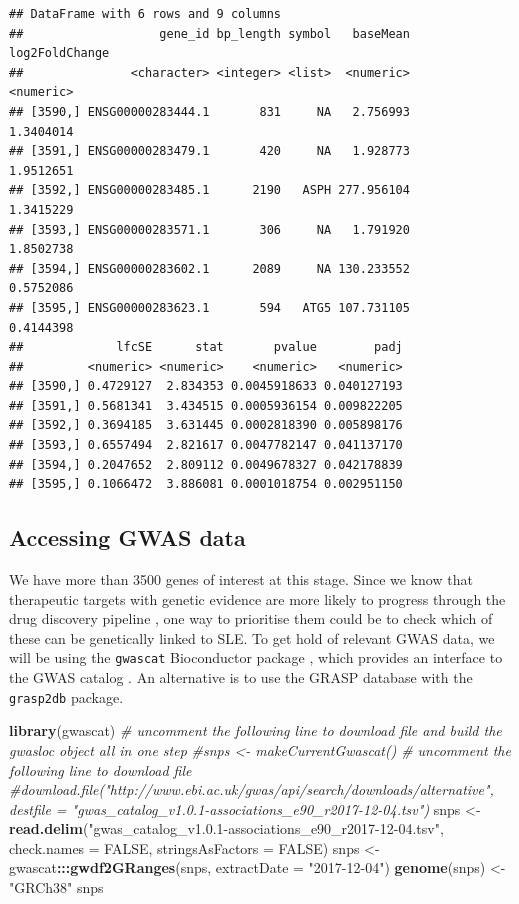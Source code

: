 \documentclass[9pt,a4paper,]{extarticle}
\newenvironment{Shaded}{\begin{snugshade}}{\end{snugshade}}
\newcommand{\KeywordTok}[1]{\textcolor[rgb]{0.13,0.29,0.53}{\textbf{#1}}}
\newcommand{\DataTypeTok}[1]{\textcolor[rgb]{0.13,0.29,0.53}{#1}}
\newcommand{\StringTok}[1]{\textcolor[rgb]{0.31,0.60,0.02}{#1}}
\newcommand{\CommentTok}[1]{\textcolor[rgb]{0.56,0.35,0.01}{\textit{#1}}}
\newcommand{\OtherTok}[1]{\textcolor[rgb]{0.56,0.35,0.01}{#1}}
\newcommand{\OperatorTok}[1]{\textcolor[rgb]{0.81,0.36,0.00}{\textbf{#1}}}
\newcommand{\NormalTok}[1]{#1}
\begin{document}
\begin{verbatim}
## DataFrame with 6 rows and 9 columns
##                   gene_id bp_length symbol   baseMean log2FoldChange
##               <character> <integer> <list>  <numeric>      <numeric>
## [3590,] ENSG00000283444.1       831     NA   2.756993      1.3404014
## [3591,] ENSG00000283479.1       420     NA   1.928773      1.9512651
## [3592,] ENSG00000283485.1      2190   ASPH 277.956104      1.3415229
## [3593,] ENSG00000283571.1       306     NA   1.791920      1.8502738
## [3594,] ENSG00000283602.1      2089     NA 130.233552      0.5752086
## [3595,] ENSG00000283623.1       594   ATG5 107.731105      0.4144398
##             lfcSE      stat       pvalue        padj
##         <numeric> <numeric>    <numeric>   <numeric>
## [3590,] 0.4729127  2.834353 0.0045918633 0.040127193
## [3591,] 0.5681341  3.434515 0.0005936154 0.009822205
## [3592,] 0.3694185  3.631445 0.0002818390 0.005898176
## [3593,] 0.6557494  2.821617 0.0047782147 0.041137170
## [3594,] 0.2047652  2.809112 0.0049678327 0.042178839
## [3595,] 0.1066472  3.886081 0.0001018754 0.002951150
\end{verbatim}

\subsection{Accessing GWAS data}\label{accessing-gwas-data}

We have more than 3500 genes of interest at this stage.
Since we know that therapeutic targets with genetic evidence are more likely to progress through the drug discovery pipeline \citep{Nelson2015}, one way to prioritise them could be to check which of these can be genetically linked to SLE.
To get hold of relevant GWAS data, we will be using the \texttt{gwascat} Bioconductor package \citep{Carey2017a}, which provides an interface to the GWAS catalog \citep{MacArthur2017}.
An alternative is to use the GRASP \citep{Eicher2015} database with the \texttt{grasp2db} \citep{Carey2017b} package.

\begin{Shaded}
\begin{Highlighting}[]
\KeywordTok{library}\NormalTok{(gwascat)}
\CommentTok{# uncomment the following line to download file and build the gwasloc object all in one step}
\CommentTok{#snps <- makeCurrentGwascat()}
\CommentTok{# uncomment the following line to download file}
\CommentTok{#download.file("http://www.ebi.ac.uk/gwas/api/search/downloads/alternative", destfile = "gwas_catalog_v1.0.1-associations_e90_r2017-12-04.tsv")}
\NormalTok{snps <-}\StringTok{ }\KeywordTok{read.delim}\NormalTok{(}\StringTok{"gwas_catalog_v1.0.1-associations_e90_r2017-12-04.tsv"}\NormalTok{, }\DataTypeTok{check.names =} \OtherTok{FALSE}\NormalTok{, }\DataTypeTok{stringsAsFactors =} \OtherTok{FALSE}\NormalTok{)}
\NormalTok{snps <-}\StringTok{ }\NormalTok{gwascat}\OperatorTok{:::}\KeywordTok{gwdf2GRanges}\NormalTok{(snps, }\DataTypeTok{extractDate =} \StringTok{"2017-12-04"}\NormalTok{)}
\KeywordTok{genome}\NormalTok{(snps) <-}\StringTok{ "GRCh38"}
\NormalTok{snps}
\end{Highlighting}
\end{Shaded}
\end{document}
